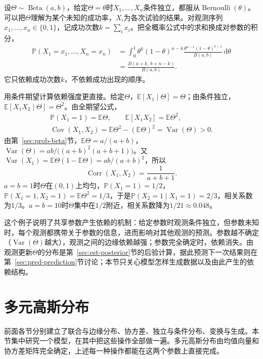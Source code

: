 \begin{example}
\label{ex:rvec-beta-bernoulli}
设$\Theta\sim\operatorname{Beta}(a,b)$，给定$\Theta=\theta$时$X_1,\ldots,X_n$条件独立，都服从$\operatorname{Bernoulli}(\theta)$。可以把$\Theta$理解为某个未知的成功率，$X_i$为各次试验的结果。对观测序列$x_1,\ldots,x_n\in\{0,1\}$，记成功次数$k=\sum_ix_i$。把全概率公式中的求和换成对参数的积分，
\[
\begin{aligned}
 \mathbb P(X_1=x_1,\ldots,X_n=x_n)&=\int_0^1\theta^k(1-\theta)^{n-k}\frac{\theta^{a-1}(1-\theta)^{b-1}}{B(a,b)}\,\mathrm d\theta\\
 &=\frac{B(a+k,\,b+n-k)}{B(a,b)} .
\end{aligned}
\]
它只依赖成功次数$k$，不依赖成功出现的顺序。

用条件期望计算依赖强度更直接。给定$\Theta$，$\mathbb E[X_1\mid\Theta]=\Theta$；由条件独立，$\mathbb E[X_1X_2\mid\Theta]=\Theta^2$。由全期望公式，
\[
\begin{gathered}
 \mathbb P(X_1=1)=\mathbb E\Theta,\qquad \mathbb E[X_1X_2]=\mathbb E\Theta^2,\\
 \operatorname{Cov}(X_1,X_2)=\mathbb E\Theta^2-(\mathbb E\Theta)^2=\operatorname{Var}(\Theta)>0 .
\end{gathered}
\]
由第~\ref{sec:prob-beta}节，$\mathbb E\Theta=a/(a+b)$，$\operatorname{Var}(\Theta)=ab/\bigl((a+b)^2(a+b+1)\bigr)$。又$\operatorname{Var}(X_1)=\mathbb E\Theta(1-\mathbb E\Theta)=ab/(a+b)^2$，所以
\[
 \operatorname{Corr}(X_1,X_2)=\frac1{a+b+1} .
\]
$a=b=1$时$\Theta$在$(0,1)$上均匀，$\mathbb P(X_1=1)=1/2$，$\mathbb P(X_1=1,X_2=1)=\mathbb E\Theta^2=1/3$，于是$\mathbb P(X_2=1\mid X_1=1)=2/3$，相关系数为$1/3$。$a=b=10$时$\Theta$集中在$1/2$附近，相关系数降为$1/21\approx0.048$。
\end{example}

这个例子说明了共享参数产生依赖的机制：给定参数时观测条件独立，但参数未知时，每个观测都携带关于参数的信息，进而影响对其他观测的预测。参数越不确定（$\operatorname{Var}(\Theta)$越大），观测之间的边缘依赖越强；参数完全确定时，依赖消失。由观测更新$\Theta$的分布是第~\ref{sec:est-posterior}节的后验计算，据此预测下一次结果则在第~\ref{sec:pred-prediction}节讨论；本节只关心模型怎样生成数据以及由此产生的依赖结构。

\section{多元高斯分布}
\label{sec:rvec-gaussian}

前面各节分别建立了联合与边缘分布、协方差、独立与条件分布、变换与生成。本节集中研究一个模型，在其中把这些操作全部做一遍。多元高斯分布由均值向量和协方差矩阵完全确定，上述每一种操作都能在这两个参数上直接完成。

